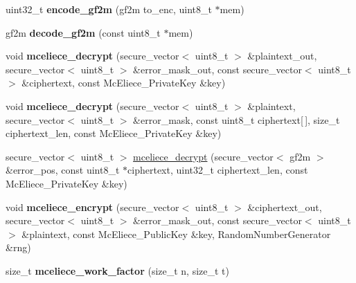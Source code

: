 \begin{DoxyCompactItemize}
\item 
\mbox{\label{namespace_botan_acc7ce066cb6c98ece3bfc7ed40ba665b}} 
uint32\+\_\+t {\bfseries encode\+\_\+gf2m} (gf2m to\+\_\+enc, uint8\+\_\+t $\ast$mem)
\item 
\mbox{\label{namespace_botan_ac67aa49c644e0c2e5c1a8ed30e6e319a}} 
gf2m {\bfseries decode\+\_\+gf2m} (const uint8\+\_\+t $\ast$mem)
\item 
\mbox{\label{namespace_botan_a18febd75324fc74a6f1004e3f8d118ad}} 
void {\bfseries mceliece\+\_\+decrypt} (secure\+\_\+vector$<$ uint8\+\_\+t $>$ \&plaintext\+\_\+out, secure\+\_\+vector$<$ uint8\+\_\+t $>$ \&error\+\_\+mask\+\_\+out, const secure\+\_\+vector$<$ uint8\+\_\+t $>$ \&ciphertext, const Mc\+Eliece\+\_\+\+Private\+Key \&key)
\item 
\mbox{\label{namespace_botan_a0c0b3e6872a88e36041d2ee95af513da}} 
void {\bfseries mceliece\+\_\+decrypt} (secure\+\_\+vector$<$ uint8\+\_\+t $>$ \&plaintext, secure\+\_\+vector$<$ uint8\+\_\+t $>$ \&error\+\_\+mask, const uint8\+\_\+t ciphertext\mbox{[}$\,$\mbox{]}, size\+\_\+t ciphertext\+\_\+len, const Mc\+Eliece\+\_\+\+Private\+Key \&key)
\item 
secure\+\_\+vector$<$ uint8\+\_\+t $>$ \mbox{\hyperlink{namespace_botan_ac84dac7bdfb3e9c9ecb19a2e55596ded}{mceliece\+\_\+decrypt}} (secure\+\_\+vector$<$ gf2m $>$ \&error\+\_\+pos, const uint8\+\_\+t $\ast$ciphertext, uint32\+\_\+t ciphertext\+\_\+len, const Mc\+Eliece\+\_\+\+Private\+Key \&key)
\item 
\mbox{\label{namespace_botan_a4b2abc4158149f6afc3f2a8d7f139c7d}} 
void {\bfseries mceliece\+\_\+encrypt} (secure\+\_\+vector$<$ uint8\+\_\+t $>$ \&ciphertext\+\_\+out, secure\+\_\+vector$<$ uint8\+\_\+t $>$ \&error\+\_\+mask\+\_\+out, const secure\+\_\+vector$<$ uint8\+\_\+t $>$ \&plaintext, const Mc\+Eliece\+\_\+\+Public\+Key \&key, Random\+Number\+Generator \&rng)
\item 
\mbox{\label{namespace_botan_a8822e6d236cbde80b706061c49ee340f}} 
size\+\_\+t {\bfseries mceliece\+\_\+work\+\_\+factor} (size\+\_\+t n, size\+\_\+t t)
\item 
\mbox{\label{namespace_botan_a8dfd25b09667ccc4f9fc801ff2577d46}} 

\end{DoxyCompactItemize}
